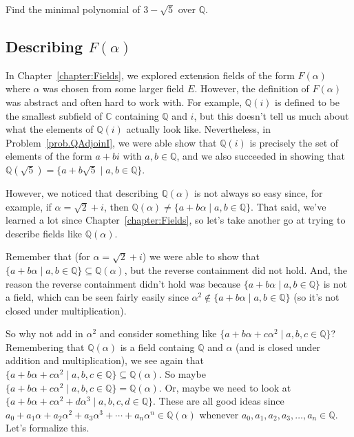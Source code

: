 \begin{problem}
Find the minimal polynomial of $3-\sqrt{5}$ over $\mathbb{Q}$.
\end{problem}

\subsection{Describing $F(\alpha)$}

In Chapter~\ref{chapter:Fields}, we explored extension fields of the form $F(\alpha)$ where $\alpha$ was chosen from some larger field $E$. However, the definition of $F(\alpha)$ was abstract and often hard to work with. For example, $\mathbb{Q}(i)$ is defined to be the smallest subfield of $\mathbb{C}$ containing $\mathbb{Q}$ and $i$, but this doesn't tell us much about what the elements of $\mathbb{Q}(i)$ actually look like. Nevertheless, in Problem~\ref{prob.QAdjoinI}, we were able show that $\mathbb{Q}(i)$ is precisely the set of elements of the form $a+bi$ with $a,b\in \mathbb{Q}$, and we also succeeded in showing that $\mathbb{Q}(\sqrt{5}) = \{a+b\sqrt{5}\mid a,b\in \mathbb{Q}\}$. 

However, we noticed that describing $\mathbb{Q}(\alpha)$ is not always so easy since, for example, if $\alpha = \sqrt{2} + i$, then $\mathbb{Q}(\alpha) \neq \{a+b\alpha\mid a,b\in \mathbb{Q}\}$. That said, we've learned a lot since Chapter~\ref{chapter:Fields}, so let's take another go at trying to describe fields like $\mathbb{Q}(\alpha)$. 

Remember that (for $\alpha = \sqrt{2} + i$) we were able to show that $\{a+b\alpha\mid a,b\in \mathbb{Q}\} \subseteq \mathbb{Q}(\alpha)$, but the reverse containment did not hold. And, the reason the reverse containment didn't hold was because $\{a+b\alpha\mid a,b\in \mathbb{Q}\}$ is not a field, which can be seen fairly easily since $\alpha^2 \notin \{a+b\alpha\mid a,b\in \mathbb{Q}\}$ (so it's not closed under multiplication). 

So why not add in $\alpha^2$ and consider something like  $\{a+b\alpha + c\alpha^2\mid a,b,c\in \mathbb{Q}\}$? Remembering that $\mathbb{Q}(\alpha)$ is a field containg $\mathbb{Q}$ and $\alpha$ (and is closed under addition and multiplication), we see again that $\{a+b\alpha + c\alpha^2\mid a,b,c\in \mathbb{Q}\} \subseteq \mathbb{Q}(\alpha)$. So maybe $\{a+b\alpha + c\alpha^2\mid a,b,c\in \mathbb{Q}\} = \mathbb{Q}(\alpha)$. Or, maybe we need to look at $\{a+b\alpha + c\alpha^2 + d\alpha^3\mid a,b,c,d\in \mathbb{Q}\}$. These are all good ideas since $a_0+a_1\alpha + a_2\alpha^2 + a_3\alpha^3 + \cdots + a_n\alpha^n \in \mathbb{Q}(\alpha)$ whenever $a_0,a_1,a_2,a_3,\ldots,a_n\in \mathbb{Q}$. Let's formalize this.


